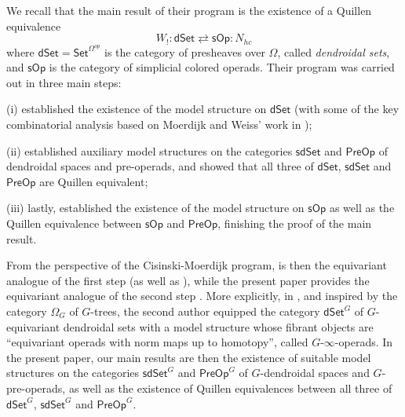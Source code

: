 \documentclass[a4paper,10pt,draft]{article}%
\begin{document}
We recall that the main result of their program is the existence of a Quillen equivalence
\[
	W_{!} \colon \mathsf{dSet} 
		\rightleftarrows
	\mathsf{sOp}  \colon N_{hc} 
\]
where $\mathsf{dSet} = \mathsf{Set}^{\Omega^{op}} $
is the category of presheaves over $\Omega$, 
called \textit{dendroidal sets},
and 
$\mathsf{sOp}$ is the category of simplicial colored operads.
Their program was carried out in three main steps:
\begin{inparaenum}
	\item[(i)] \cite{CM11} established the existence of the model structure on $\mathsf{dSet}$
	(with some of the key combinatorial analysis based on Moerdijk and Weiss' work in \cite{MW09});
	\item[(ii)] \cite{CM13a} established auxiliary model structures on the categories $\mathsf{sdSet}$ and $\mathsf{PreOp}$
	of dendroidal spaces and pre-operads, and showed that all three of $\mathsf{dSet}$, $\mathsf{sdSet}$ and $\mathsf{PreOp}$ are Quillen equivalent;
	\item[(iii)] lastly, \cite{CM13b} established the existence of the model structure on $\mathsf{sOp}$ as well as the Quillen equivalence between $\mathsf{sOp}$ and $\mathsf{PreOp}$, finishing the proof of the main result.
\end{inparaenum}

From the perspective of the Cisinski-Moerdijk program, 
\cite{Per17} is then the equivariant analogue of the first step \cite{CM11} (as well as \cite{MW09}), 
while the present paper provides the equivariant analogue of the
second step \cite{CM13b}.
More explicitly, in \cite{Per17}, and inspired by the category $\Omega_G$ of $G$-trees,
the second author equipped the category
$\mathsf{dSet}^G$ of $G$-equivariant dendroidal sets with a model structure whose fibrant objects 
are ``equivariant operads with norm maps up to homotopy'',
called $G$-$\infty$-operads.
In the present paper, our main results are then the existence of suitable model structures on the categories 
$\mathsf{sdSet}^G$ and $\mathsf{PreOp}^G$
of $G$-dendroidal spaces and $G$-pre-operads,
as well as the existence of Quillen equivalences
between all three of 
$\mathsf{dSet}^G$, $\mathsf{sdSet}^G$ and $\mathsf{PreOp}^G$.
\end{document}
